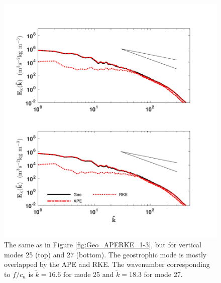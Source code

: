 \begin{figure}[H]
\includegraphics[scale=1]{Chapter4/img/Geo_APERKE_25-27}
\caption{The same as in Figure \ref{fig:Geo_APERKE_1-3}, but for vertical modes 25 (top) and 27 (bottom). The geostrophic mode is mostly overlapped by the APE and RKE. The wavenumber corresponding to $f/c_n$ is $\tilde{k} = 16.6$ for mode 25 and $\tilde{k} = 18.3$ for mode 27.}
\label{fig:Geo_APERKE_25-27}
\end{figure}

